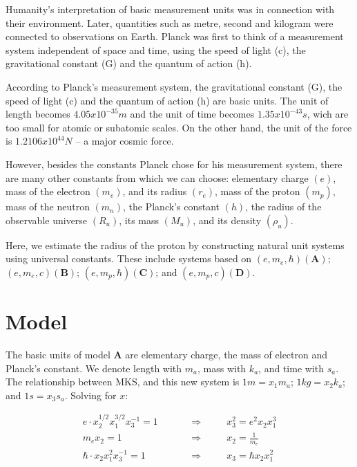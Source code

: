 \documentclass[11pt]{article}
\begin{document}
Humanity's interpretation of basic measurement units was in connection with their environment. Later, quantities such as metre, second and kilogram were connected to observations on Earth. Planck was first to think of a measurement system independent of space and time, using the speed of light (c), the gravitational constant (G) and the quantum of action (h). 

According to Planck's measurement system, the gravitational constant (G), the speed of light (c) and the quantum of action (h) are basic units. The unit of length becomes $4.05 x 10^{-35} m$ and  the unit of time becomes $1.35 x 10^{-43} s$, wich are too small for atomic or subatomic scales. On the other hand, the unit of the force is $1.2106 x10^{44} N$ -- a major cosmic force.

However, besides the constants Planck chose for his measurement system, there are many other constants from which we can choose: elementary charge $(e)$, mass of the electron $(m_e)$, and its radius $(r_e)$, mass of the proton $(m_p)$, mass of the neutron $(m_n)$, the Planck's constant $(h)$, the radius of the observable universe $(R_u)$, its mass $(M_u)$, and its density $(\rho_u)$. 

Here, we estimate the radius of the proton by constructing natural unit systems using universal constants. These include systems based on $(e, m_e, \hbar) (\mathbf{A})$; $(e, m_e, c) (\mathbf{B})$; $(e, m_p, \hbar) (\mathbf{C})$; and $(e, m_p, c) (\mathbf{D})$. 

\section{Model}

The basic units of model $\mathbf{A}$ are elementary charge, the mass of electron and Planck's constant. We denote length with $m_a$, mass with $k_a$, and time with $s_a$. The relationship between MKS, and this new system is $1 m = x_1 m_a$; $1kg=x_2k_a$; and $1s=x_3s_a$. Solving for $x$: 

\[
\begin{align} 
    e\cdot x^{1/2}_{2} x^{3/2}_{1} x^{-1}_{3} = 1 \hspace{1cm} &\Rightarrow \hspace{1cm} x^2_3 = e^2 x_2 x^3_1 \\
    m_ex_2 = 1 \hspace{1cm} & \Rightarrow \hspace{1cm} x_2 = \frac{1}{m_e} \\
    \hbar \cdot x_2 x^2_1 x^{-1}_3 = 1 \hspace{1cm} & \Rightarrow \hspace{1cm} x_3 = \hbar x_2 x^2_1
\end{align}
\]
\end{document}
